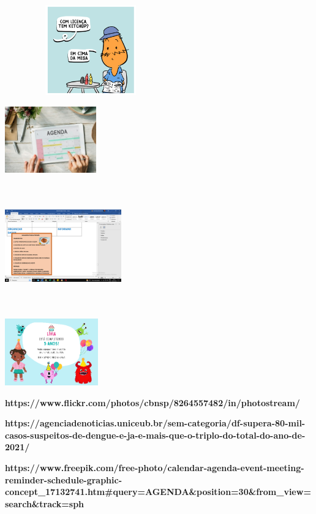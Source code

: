 {{{{\includegraphics[width=2.91667in,height=1.53611in]{media/image87.png}

\includegraphics[width=1.55208in,height=1.12778in]{media/image90.jpeg}

\includegraphics[width=1.97452in,height=2.09063in]{media/image91.png}

\includegraphics[width=1.58681in,height=1.13333in]{media/image92.png}

\textbf{https://www.flickr.com/photos/cbnsp/8264557482/in/photostream/}

\textbf{https://agenciadenoticias.uniceub.br/sem-categoria/df-supera-80-mil-casos-suspeitos-de-dengue-e-ja-e-mais-que-o-triplo-do-total-do-ano-de-2021/}

\textbf{https://www.freepik.com/free-photo/calendar-agenda-event-meeting-reminder-schedule-graphic-concept\_17132741.htm\#query=AGENDA\&position=30\&from\_view=search\&track=sph}


}}}}

